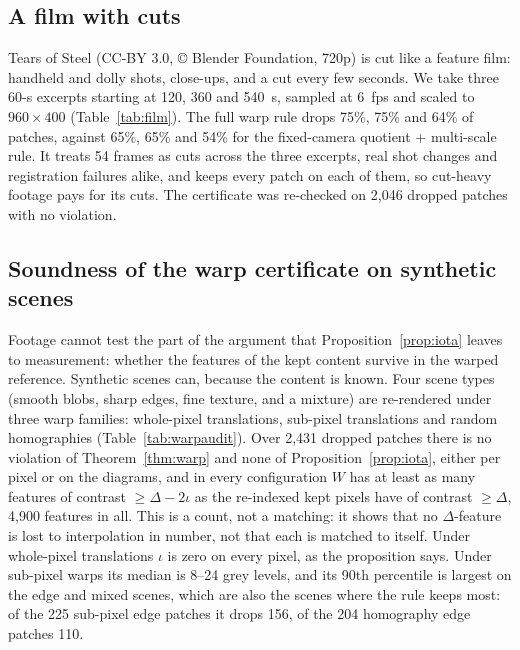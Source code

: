 \subsection{A film with cuts}

Tears of Steel \citep{tearsofsteel} (CC-BY 3.0, \copyright{} Blender Foundation, 720p) is cut like a feature film: handheld and dolly shots, close-ups, and a cut every few seconds. We take three 60-s excerpts starting at 120, 360 and 540~s, sampled at 6~fps and scaled to $960{\times}400$ (Table~\ref{tab:film}). The full warp rule drops 75\%, 75\% and 64\% of patches, against 65\%, 65\% and 54\% for the fixed-camera quotient + multi-scale rule. It treats 54 frames as cuts across the three excerpts, real shot changes and registration failures alike, and keeps every patch on each of them, so cut-heavy footage pays for its cuts. The certificate was re-checked on 2{,}046 dropped patches with no violation.

\begin{table}[t]
\centering\small

\caption{Tears of Steel, three 60-s excerpts at 6~fps. ``Cuts'' counts frames on which registration failed and the canvas was reset, summed over the excerpts; the fixed-camera rules have no notion of a cut.}
\label{tab:film}
\end{table}

\subsection{Soundness of the warp certificate on synthetic scenes}
\label{sec:warpaudit}

Footage cannot test the part of the argument that Proposition~\ref{prop:iota} leaves to measurement: whether the features of the kept content survive in the warped reference. Synthetic scenes can, because the content is known. Four scene types (smooth blobs, sharp edges, fine texture, and a mixture) are re-rendered under three warp families: whole-pixel translations, sub-pixel translations and random homographies (Table~\ref{tab:warpaudit}). Over 2{,}431 dropped patches there is no violation of Theorem~\ref{thm:warp} and none of Proposition~\ref{prop:iota}, either per pixel or on the diagrams, and in every configuration $W$ has at least as many features of contrast $\ge \Delta - 2\iota$ as the re-indexed kept pixels have of contrast $\ge \Delta$, 4{,}900 features in all. This is a count, not a matching: it shows that no $\Delta$-feature is lost to interpolation in number, not that each is matched to itself. Under whole-pixel translations $\iota$ is zero on every pixel, as the proposition says. Under sub-pixel warps its median is 8--24 grey levels, and its 90th percentile is largest on the edge and mixed scenes, which are also the scenes where the rule keeps most: of the 225 sub-pixel edge patches it drops 156, of the 204 homography edge patches 110.

